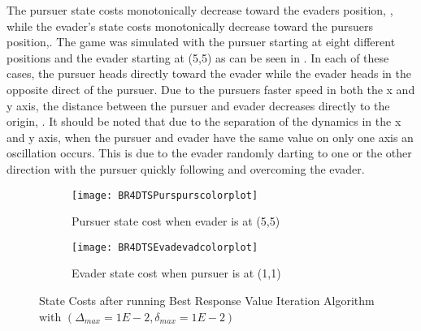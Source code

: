 The pursuer state costs monotonically decrease toward the evaders position, , while the evader's state costs monotonically decrease toward the pursuers position,. The game was simulated with the pursuer starting at eight different positions and the evader starting at (5,5) as can be seen in . In each of these cases, the pursuer heads directly toward the evader while the evader heads in the opposite direct of the pursuer. Due to the pursuers faster speed in both the x and y axis, the distance between the pursuer and evader decreases directly to the origin, . It should be noted that due to the separation of the dynamics in the x and y axis, when the pursuer and evader have the same value on only one axis an oscillation occurs. This is due to the evader randomly darting to one or the other direction with the pursuer quickly following and overcoming the evader.
\begin{figure}[h!]
\centering
\begin{subfigure}[t]{0.475\textwidth}
	\centering
	\texttt{[image: BR4DTSPurspurscolorplot]}
	\caption{Pursuer state cost when evader is at (5,5)}
	\label{BR4DTSPcp}
\end{subfigure}
\hfill
\begin{subfigure}[t]{0.475\textwidth}
	\centering
	\texttt{[image: BR4DTSEvadevadcolorplot]}
	\caption{Evader state cost when pursuer is at (1,1)}
	\label{BR4DTSEcp}
\end{subfigure}
\caption{State Costs after running Best Response Value Iteration Algorithm with $(\Delta_{max} = 1E-2,\delta_{max} = 1E-2)$}
\label{BR4DTScp}
\end{figure}
